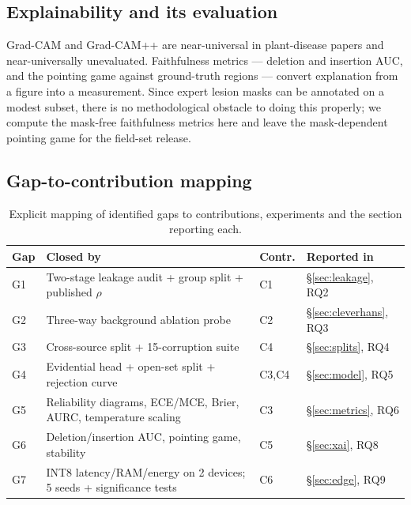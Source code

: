 \documentclass[10pt,twocolumn,a4paper]{article}
\begin{document}
\subsection{Explainability and its evaluation}
Grad-CAM \cite{gradcam2017} and Grad-CAM++ \cite{gradcampp2018} are near-universal in plant-disease papers and near-universally unevaluated. Faithfulness metrics --- deletion and insertion AUC, and the pointing game against ground-truth regions --- convert explanation from a figure into a measurement. Since expert lesion masks can be annotated on a modest subset, there is no methodological obstacle to doing this properly; we compute the mask-free faithfulness metrics here and leave the mask-dependent pointing game for the field-set release.

\subsection{Gap-to-contribution mapping}

\begin{table}[H]
\centering
\caption{Explicit mapping of identified gaps to contributions, experiments and the section reporting each.}
\label{tab:gapmap}
{\footnotesize
\begin{tabularx}{\columnwidth}{@{}p{0.5cm} X p{0.5cm} p{1.35cm}@{}}
\toprule
\rowcolor{hdrgray}
Gap & Closed by & Contr. & Reported in \\
\midrule
G1 & Two-stage leakage audit + group split + published $\rho$ & C1 & \S\ref{sec:leakage}, RQ2 \\
G2 & Three-way background ablation probe & C2 & \S\ref{sec:cleverhans}, RQ3 \\
G3 & Cross-source split + 15-corruption suite & C4 & \S\ref{sec:splits}, RQ4 \\
G4 & Evidential head + open-set split + rejection curve & C3,C4 & \S\ref{sec:model}, RQ5 \\
G5 & Reliability diagrams, ECE/MCE, Brier, AURC, temperature scaling & C3 & \S\ref{sec:metrics}, RQ6 \\
G6 & Deletion/insertion AUC, pointing game, stability & C5 & \S\ref{sec:xai}, RQ8 \\
G7 & INT8 latency/RAM/energy on 2 devices; 5 seeds + significance tests & C6 & \S\ref{sec:edge}, RQ9 \\
\bottomrule
\end{tabularx}}
\end{table}

\end{document}
